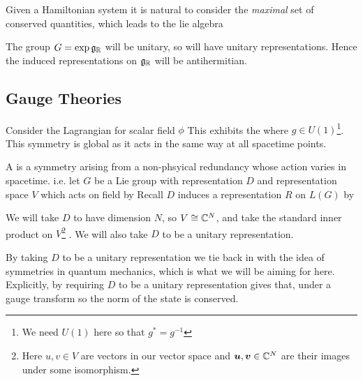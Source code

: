 \documentclass{article}
\begin{document}
Given a Hamiltonian system it is natural to consider 
the \emph{maximal} set of conserved quantities, which leads to the lie algebra 
\begin{fact}
The group $G = \exp \mathfrak{g}_{\mathbb{R}}$ will be unitary, so will have unitary representations. Hence the induced representations on $\mathfrak{g}_{\mathbb{R}}$ will be antihermitian. 
\end{fact}

\subsection{Gauge Theories}

\begin{example}
Consider the Lagrangian for scalar field $\phi$
This exhibits the  
where $g \in U(1)$\footnote{We need $U(1)$ here so that $g^\ast = g^{-1}$}. This symmetry is global as it acts in the same way at all spacetime points.
\end{example}

\begin{definition}
A  is a symmetry arising from a non-phsyical redundancy whose action varies in spacetime. i.e. let $G$ be a Lie group with representation $D$ and representation space $V$ 
which acts on field 
by 
Recall $D$ induces a representation $R$ on $L(G)$ by 
\end{definition}

We will take $D$ to have dimension $N$, so $V \cong \mathbb{C}^N$, and take the standard inner product on $V$\footnote{Here $u,v \in V$ are vectors in our vector space and $\bm{u},\bm{v} \in \mathbb{C}^N$ are their images under some isomorphism. }
. We will also take $D$ to be a unitary representation.

\begin{idea}
By taking $D$ to be a unitary representation we tie back in with the idea of symmetries in quantum mechanics, which is what we will be aiming for here. Explicitly, by requiring $D$ to be a unitary representation gives that, under a gauge transform  
so the norm of the state is conserved. 
\end{idea}
\end{document}
